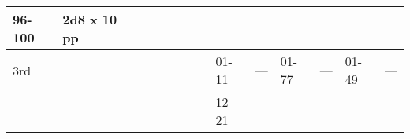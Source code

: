 \begin{longtable}{llllllllllllll}
{\begin{minipage}[t]{0.393in}
96-100\end{minipage}} & \multicolumn{1}{p{0.469in}|}{\begin{minipage}[t]{0.469in}\raggedright
2d8 x 10 pp\end{minipage}} & \multicolumn{1}{p{0.923in}|}{\begin{minipage}[t]{0.923in}\raggedright
\end{minipage}} & \multicolumn{1}{p{0.469in}|}{\begin{minipage}[t]{0.469in}\raggedright
\end{minipage}} & \multicolumn{1}{p{0.626in}|}{\begin{minipage}[t]{0.626in}\raggedright
\end{minipage}} & \multicolumn{1}{p{0.469in}|}{\begin{minipage}[t]{0.469in}\centering
\end{minipage}}\\
\hline
\multicolumn{8}{p{1.150in}|}{\begin{minipage}[t]{1.150in}\centering
3rd\end{minipage}} & \multicolumn{1}{|p{0.393in}|}{\begin{minipage}[t]{0.393in}\raggedright
01-11\end{minipage}} & \multicolumn{1}{p{0.469in}|}{\begin{minipage}[t]{0.469in}\raggedright
---\end{minipage}} & \multicolumn{1}{p{0.923in}|}{\begin{minipage}[t]{0.923in}\raggedright
01-77\end{minipage}} & \multicolumn{1}{p{0.469in}|}{\begin{minipage}[t]{0.469in}\raggedright
---\end{minipage}} & \multicolumn{1}{p{0.626in}|}{\begin{minipage}[t]{0.626in}\raggedright
01-49\end{minipage}} & \multicolumn{1}{p{0.469in}|}{\begin{minipage}[t]{0.469in}\centering
---\end{minipage}}\\
\hline
\multicolumn{8}{p{1.150in}|}{\begin{minipage}[t]{1.150in}\centering
\end{minipage}} & \multicolumn{1}{|p{0.393in}|}{\begin{minipage}[t]{0.393in}\raggedright
12-21\end{minipage}} & \multicolumn{1}{p{0.469in}|}{\begin{minipage}[t]{0.469in}\raggedright

\end{minipage}}
\end{longtable}
